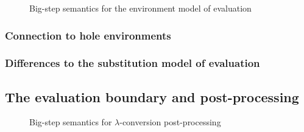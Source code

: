 
\begin{figure}
  \centering
  \begin{mdframed}
    \begin{singlespace}
      
    \end{singlespace}
  \end{mdframed}
  \caption{Big-step semantics for the environment model of evaluation}
  \label{fig:big-step-formal}
\end{figure}


\subsubsection{Connection to hole environments}
\label{sec:holeenv_evalenv_connection}

\subsubsection{Differences to the substitution model of evaluation}
\label{sec:differences_subst}

\subsection{The evaluation boundary and post-processing}
\label{sec:closures_to_lambdas}





\begin{figure}
  \centering
  \begin{mdframed}
    \begin{singlespace}
      
    \end{singlespace}
  \end{mdframed}
  \caption{Big-step semantics for $\lambda$-conversion post-processing}
  \label{fig:big-step-inside-formal}
\end{figure}

